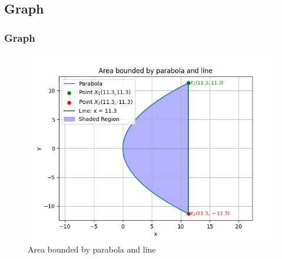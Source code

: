 \documentclass{beamer}
\theoremstyle{remark}
\numberwithin{equation}{section}
\begin{document}
\subsection{Graph}
\begin{frame}
\frametitle{Graph}
\begin{figure}[h]
    \centering
    \includegraphics[width=\columnwidth]{figs/fig.png}
    \caption{Area bounded by  parabola and line}
\end{figure}
\end{frame}
\end{document}
